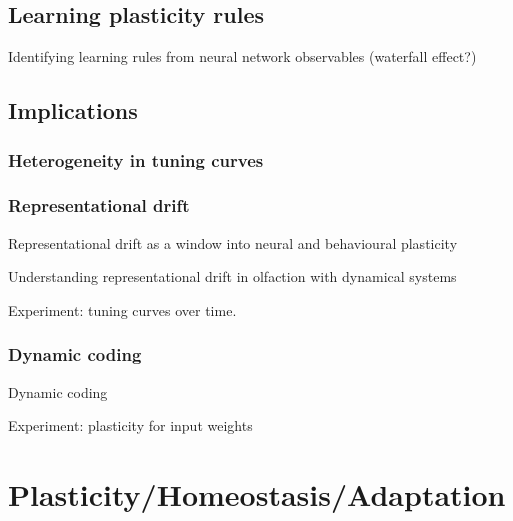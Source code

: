 \documentclass{article}
\theoremstyle{definition} \newtheorem{definition}{Definition}
\theoremstyle{remark} \newtheorem{remark}{Remark}
\newcounter{ct}
\begin{document}
\subsection{Learning plasticity rules} %
\citep{pereira2018attractor}

\citep{shervani2023meta}
\citep{bell2024discovering}
\citep{jordan2021plasticity}

Identifying learning rules from neural network observables \citep{nayebi2020learning} (waterfall effect?)
\citep{kepple2022curriculum}
\citep{mcmahan2021learning}
\citep{ashwood2020inferring}

\citep{tyulmankov2022meta}



\subsection{Implications}

\subsubsection{Heterogeneity in tuning curves}




\subsubsection{Representational drift}

Representational drift as a window into neural and behavioural plasticity \citep{micou2023representational}

Understanding representational drift in olfaction with dynamical  systems \citep{barwich2023drift}

\citep{wolff2020drifting}

\citep{buschman2022wm}

Experiment: tuning curves over time.




\subsubsection{Dynamic coding}
Dynamic coding \citep{stroud2024computational}

Experiment: plasticity for input weights





\section{Plasticity/Homeostasis/Adaptation}
\citep{martin2000plasticity}
\citep{takeuchi2014plasticity}
\end{document}
